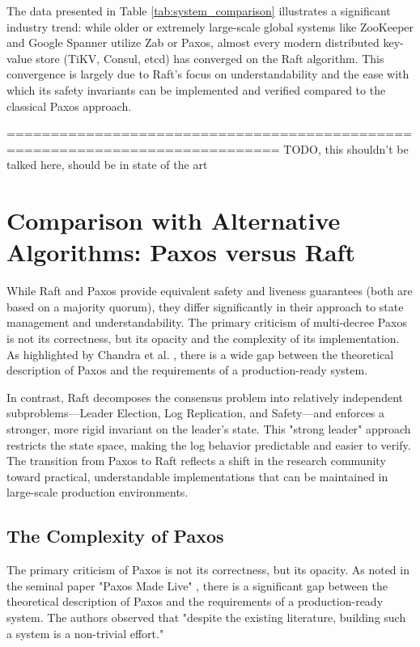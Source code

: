 The data presented in Table \ref{tab:system_comparison} illustrates a significant industry trend: while older or extremely large-scale global systems like ZooKeeper and Google Spanner utilize Zab or Paxos, almost every modern distributed key-value store (TiKV, Consul, etcd) has converged on the Raft algorithm. This convergence is largely due to Raft's focus on understandability and the ease with which its safety invariants can be implemented and verified compared to the classical Paxos approach.


=============================================================================
TODO, this shouldn't be talked here, should be in state of the art
\section{Comparison with Alternative Algorithms: Paxos versus Raft}
While Raft and Paxos provide equivalent safety and liveness guarantees (both are based on a majority quorum), they differ significantly in their approach to state management and understandability. The primary criticism of multi-decree Paxos is not its correctness, but its opacity and the complexity of its implementation. As highlighted by Chandra et al. \cite{Chandra2007}, there is a wide gap between the theoretical description of Paxos and the requirements of a production-ready system.

In contrast, Raft decomposes the consensus problem into relatively independent subproblems—Leader Election, Log Replication, and Safety—and enforces a stronger, more rigid invariant on the leader's state. This "strong leader" approach restricts the state space, making the log behavior predictable and easier to verify. The transition from Paxos to Raft reflects a shift in the research community toward practical, understandable implementations that can be maintained in large-scale production environments.

\subsection{The Complexity of Paxos}
The primary criticism of Paxos is not its correctness, but its opacity. As noted in the seminal paper "Paxos Made Live" \cite{Chandra2007}, there is a significant gap between the theoretical description of Paxos and the requirements of a production-ready system. The authors observed that "despite the existing literature, building such a system is a non-trivial effort."

